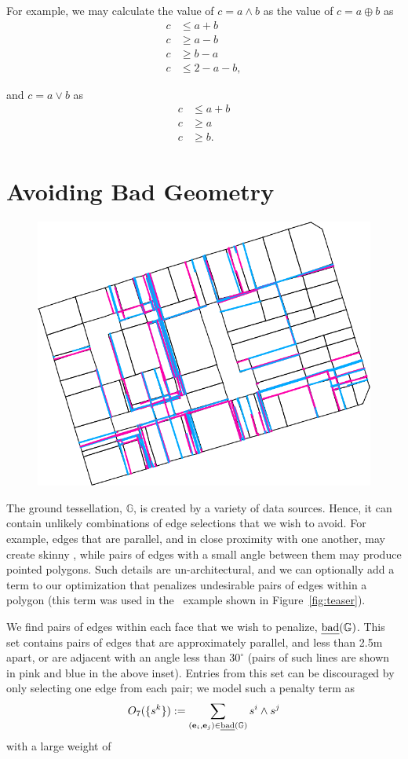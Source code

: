 For example, we may calculate the value of $c = a \land b$ as
%
%
%
%
the value of $c = a \oplus b$ as
%
\begin{align*}
c &\le a + b\\
c &\ge a-b\\
c &\ge b-a\\
c &\le 2-a-b,
\end{align*}

and $c= a \lor b$ as
%
\begin{align*}
c &\le a + b\\
c &\ge a\\
c &\ge b.
\end{align*}
\fi
 
 
 
\section{Avoiding Bad Geometry}

\begin{figure}
\vspace*{-.35in}
\hspace*{-.2in}
  \includegraphics[width=0.45\columnwidth]{../images/partition/bad.png}
\end{figure}
The ground tessellation, $\mathbb{G}$, is created by a variety of data sources. Hence, it can contain unlikely combinations of edge selections that we wish to avoid. For example, edges that are parallel, and in close proximity with one another, may create skinny \footprintpolygons, while pairs of edges with a small angle between them may produce pointed polygons. Such details are un-architectural, and we can optionally add a term to our optimization that penalizes undesirable pairs of edges within a polygon (this term was used in the \LondonRS~example shown in Figure~\ref{fig:teaser}).

We find pairs of edges within each face that we wish to penalize, $\text{\emph{bad}}(\mathbb{G})$. This set contains pairs of edges that are approximately parallel, and less than 2.5m apart, or are adjacent with an angle less than $30^\circ$ (pairs of such lines are shown in pink and blue in the above inset). 
Entries from this set can be discouraged by only selecting one edge from each pair; we model such a penalty term as
%
$$O_7 (\{ s^k \}) := \sum_{(\mathbf{e}_i,\mathbf{e}_j) \in \text{\emph{bad}}(\mathbb{G})} s^i \land  s^j $$
with a large weight of 

\pagebreak
